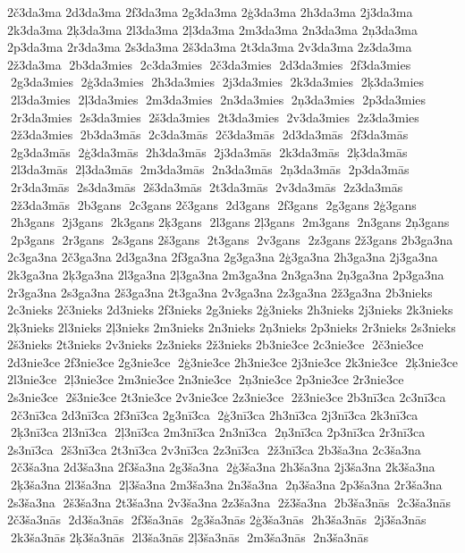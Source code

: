 2č3da3ma  	2d3da3ma  	2f3da3ma  	2g3da3ma  
2ģ3da3ma  	2h3da3ma  	2j3da3ma  	2k3da3ma  
2ķ3da3ma  	2l3da3ma  
2ļ3da3ma  	2m3da3ma  	2n3da3ma  
2ņ3da3ma  	2p3da3ma  	2r3da3ma  	2s3da3ma  
2š3da3ma  	2t3da3ma  	2v3da3ma  	2z3da3ma  
2ž3da3ma  2b3da3mies  2c3da3mies  2č3da3mies  2d3da3mies  2f3da3mies  2g3da3mies  2ģ3da3mies  2h3da3mies  2j3da3mies  2k3da3mies  2ķ3da3mies  2l3da3mies  2ļ3da3mies  2m3da3mies  2n3da3mies  2ņ3da3mies  2p3da3mies  2r3da3mies  2s3da3mies  2š3da3mies  2t3da3mies  2v3da3mies  2z3da3mies  2ž3da3mies  2b3da3mās  2c3da3mās  2č3da3mās  2d3da3mās  2f3da3mās  2g3da3mās  2ģ3da3mās  2h3da3mās  2j3da3mās  2k3da3mās  2ķ3da3mās  2l3da3mās  2ļ3da3mās  2m3da3mās  2n3da3mās  2ņ3da3mās  2p3da3mās  2r3da3mās  2s3da3mās  2š3da3mās  2t3da3mās  2v3da3mās  2z3da3mās  2ž3da3mās  2b3gans  2c3gans  	2č3gans  2d3gans  2f3gans  2g3gans  	2ģ3gans  2h3gans  2j3gans  2k3gans  	2ķ3gans  2l3gans  	2ļ3gans  2m3gans  2n3gans  	2ņ3gans  2p3gans  2r3gans  2s3gans  	2š3gans  2t3gans  2v3gans  2z3gans  	2ž3gans  	2b3ga3na  	2c3ga3na  
2č3ga3na  	2d3ga3na  	2f3ga3na  	2g3ga3na  
2ģ3ga3na  	2h3ga3na  	2j3ga3na  	2k3ga3na  
2ķ3ga3na  	2l3ga3na  
2ļ3ga3na  	2m3ga3na  	2n3ga3na  
2ņ3ga3na  	2p3ga3na  	2r3ga3na  	2s3ga3na  
2š3ga3na  	2t3ga3na  	2v3ga3na  	2z3ga3na  
2ž3ga3na  	2b3nieks  	2c3nieks  
2č3nieks  	2d3nieks  	2f3nieks  	2g3nieks  
2ģ3nieks  	2h3nieks  	2j3nieks  	2k3nieks  
2ķ3nieks  	2l3nieks  
2ļ3nieks  	2m3nieks  	2n3nieks  
2ņ3nieks  	2p3nieks  	2r3nieks  	2s3nieks  
2š3nieks  	2t3nieks  	2v3nieks  	2z3nieks  
2ž3nieks  
2b3nie3ce  
2c3nie3ce  2č3nie3ce  
2d3nie3ce  
2f3nie3ce  
2g3nie3ce  2ģ3nie3ce  
2h3nie3ce  
2j3nie3ce  
2k3nie3ce  2ķ3nie3ce  
2l3nie3ce  2ļ3nie3ce  
2m3nie3ce  
2n3nie3ce  2ņ3nie3ce  
2p3nie3ce  
2r3nie3ce  
2s3nie3ce  2š3nie3ce  
2t3nie3ce  
2v3nie3ce  
2z3nie3ce  2ž3nie3ce  
2b3nī3ca  
2c3nī3ca  2č3nī3ca  
2d3nī3ca  
2f3nī3ca  
2g3nī3ca  2ģ3nī3ca  
2h3nī3ca  
2j3nī3ca  
2k3nī3ca  2ķ3nī3ca  
2l3nī3ca  2ļ3nī3ca  
2m3nī3ca  
2n3nī3ca  2ņ3nī3ca  
2p3nī3ca  
2r3nī3ca  
2s3nī3ca  2š3nī3ca  
2t3nī3ca  
2v3nī3ca  
2z3nī3ca  2ž3nī3ca  
2b3ša3na  
2c3ša3na  2č3ša3na  
2d3ša3na  
2f3ša3na  
2g3ša3na  2ģ3ša3na  
2h3ša3na  
2j3ša3na  
2k3ša3na  2ķ3ša3na  
2l3ša3na  2ļ3ša3na  
2m3ša3na  
2n3ša3na  2ņ3ša3na  
2p3ša3na  
2r3ša3na  
2s3ša3na  2š3ša3na  
2t3ša3na  
2v3ša3na  
2z3ša3na  2ž3ša3na  2b3ša3nās  2c3ša3nās  
2č3ša3nās  2d3ša3nās  2f3ša3nās  2g3ša3nās  
2ģ3ša3nās  2h3ša3nās  2j3ša3nās  2k3ša3nās  
2ķ3ša3nās  2l3ša3nās  
2ļ3ša3nās  2m3ša3nās  2n3ša3nās  
